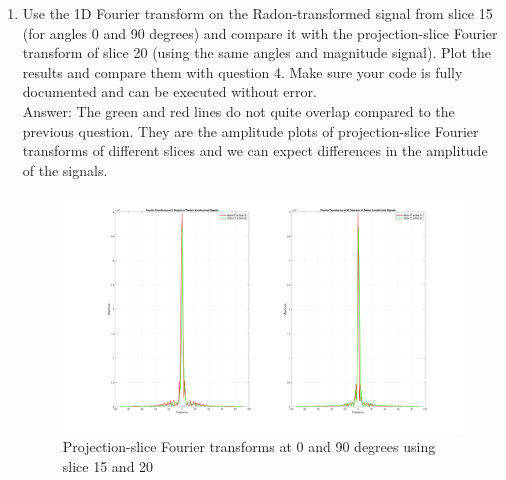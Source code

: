 \documentclass[12pt,twoside]{article}
\begin{document}
\begin{enumerate}
    \item Use the 1D Fourier transform on the Radon-transformed signal from slice 15 (for angles 0 and 90 degrees) and 
    compare it with the projection-slice Fourier transform of slice 20 (using the same angles and magnitude signal). 
    Plot the results and compare them with question 4.
    Make sure your code is fully documented and can be executed without error.\\
    Answer: The green and red lines do not quite overlap  compared to the previous question.
    They are the amplitude plots of  projection-slice Fourier transforms of different slices and we can expect differences in the amplitude of the signals.
    \begin{figure}[H]
    \centering
    \captionsetup{justification=raggedright,singlelinecheck=false}
    \includegraphics[width=400pt]{fig2.png}
    \caption{Projection-slice Fourier transforms at 0 and 90 degrees using slice 15 and 20}
    \label{fig2}
     \end{figure}
    \end{enumerate}
\end{document}
